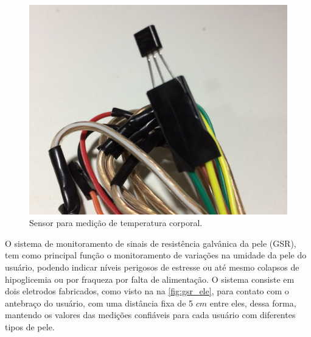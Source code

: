 \begin{figure}
    \begin{center}
        \includegraphics[scale=0.1]{figuras/temp_ele.jpg}
    \end{center}
    \caption{Sensor para medição de temperatura corporal.}
    \label{fig:temp_ele}
\end{figure}


O sistema de monitoramento de sinais de resistência galvânica da pele (GSR),
tem como principal função o monitoramento de variações na umidade da pele do
usuário, podendo indicar níveis perigosos de estresse ou até mesmo colapsos de
hipoglicemia ou por fraqueza por falta de alimentação. O sistema consiste em
dois eletrodos fabricados, como visto na na \ref{fig:gsr_ele}, para contato com o
antebraço do usuário, com uma distância fixa de 5 $cm$ entre eles, dessa forma,
mantendo os valores das medições confiáveis para cada usuário com diferentes tipos de pele.

